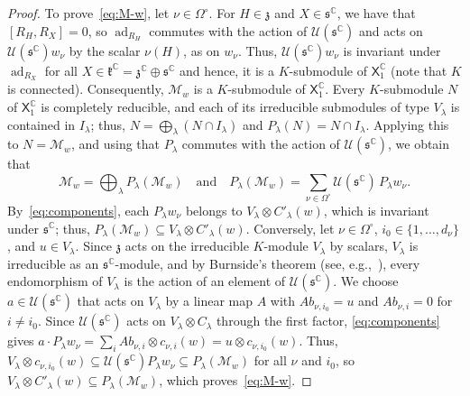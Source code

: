 \documentclass{article}
\newcommand{\C}{\mathbb{C}}
\newcommand{\frakk}{\mathfrak{k}}
\newcommand{\fraks}{\mathfrak{s}}
\newcommand{\frakz}{\mathfrak{z}}
\newcommand{\sX}{\mathsf{X}}
\theoremstyle{definition}
\theoremstyle{plain}
\begin{document}
\begin{proof}
To prove~\eqref{eq:M-w}, let $\nu\in\Omega^\circ$.
For $H\in\frakz$ and $X\in\fraks^\C$, we have that $[R_H,R_X]=0$, so $\operatorname{ad}_{R_H}$ commutes with the action of $\mathcal U(\fraks^\C)$ and acts on $\mathcal U(\fraks^\C)w_\nu$ by the scalar $\nu(H)$, as on $w_\nu$.
Thus, $\mathcal U(\fraks^\C)w_\nu$ is invariant under $\operatorname{ad}_{R_X}$ for all $X\in\frakk^\C=\frakz^\C \oplus \fraks^\C$ and hence, it is a $K$-submodule of $\sX_1^\C$ (note that $K$ is connected). Consequently, $\mathcal M_w$ is a $K$-submodule of $\sX_1^\C$.
Every $K$-submodule $N$ of $\sX_1^\C$ is completely reducible, and each of its irreducible submodules of type $V_\lambda$ is contained in $I_\lambda$; thus, $N=\bigoplus_\lambda(N\cap I_\lambda)$ and $P_\lambda(N)=N\cap I_\lambda$.
Applying this to $N=\mathcal M_w$, and using that $P_\lambda$ commutes with the action of $\mathcal U(\fraks^\C)$, we obtain that
$$
\mathcal M_w=\bigoplus_\lambda P_\lambda(\mathcal M_w)
\quad\mbox{and}\quad
P_\lambda(\mathcal M_w)=\sum_{\nu\in\Omega^\circ}\mathcal U(\fraks^\C)\,P_\lambda w_\nu.
$$
By~\eqref{eq:components}, each $P_\lambda w_\nu$ belongs to $V_\lambda\otimes C'_\lambda(w)$, which is invariant under $\fraks^\C$; thus, $P_\lambda(\mathcal M_w)\subseteq V_\lambda\otimes C'_\lambda(w)$.
Conversely, let $\nu\in\Omega^\circ$, $i_0\in\{1,\ldots,d_\nu\}$, and $u\in V_\lambda$.
Since $\frakz$ acts on the irreducible $K$-module $V_\lambda$ by scalars, $V_\lambda$ is irreducible as an $\fraks^\C$-module, and by Burnside's theorem (see, e.g.,~\cite[Chapter~XVII, Section~3]{GTM211}), every endomorphism of $V_\lambda$ is the action of an element of $\mathcal U(\fraks^\C)$.
We choose $a\in\mathcal U(\fraks^\C)$ that acts on $V_\lambda$ by a linear map $A$ with $Ab_{\nu,i_0}=u$ and $Ab_{\nu,i}=0$ for $i\neq i_0$.
Since $\mathcal U(\fraks^\C)$ acts on $V_\lambda\otimes C_\lambda$ through the first factor, \eqref{eq:components} gives $a\cdot P_\lambda w_\nu=\sum_iAb_{\nu,i}\otimes c_{\nu,i}(w)=u\otimes c_{\nu,i_0}(w)$.
Thus, $V_\lambda\otimes c_{\nu,i_0}(w)\subseteq\mathcal U(\fraks^\C)P_\lambda w_\nu\subseteq P_\lambda(\mathcal M_w)$ for all $\nu$ and $i_0$, so $V_\lambda\otimes C'_\lambda(w)\subseteq P_\lambda(\mathcal M_w)$, which proves~\eqref{eq:M-w}.


\end{proof}
\end{document}
